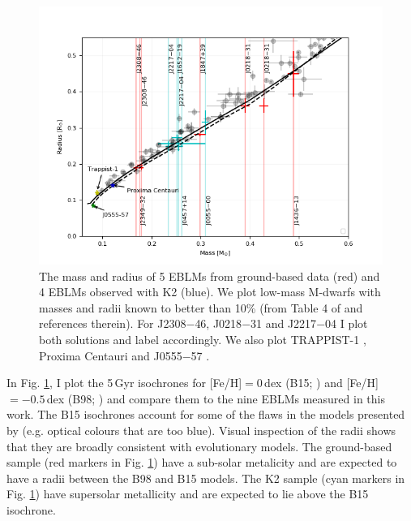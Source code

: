 \begin{figure}
    \centering
    \includegraphics{9-Discussion/images/mass_radius.png}
    \caption{The mass and radius of 5 EBLMs from ground-based data (red) and 4 EBLMs observed with K2 (blue). We plot low-mass M-dwarfs with masses and radii known to better than 10\% (from Table 4 of \protect\citep{2018arXiv180505841C} and references therein). For J2308$-$46, J0218$-$31 and J2217$-$04 I plot both solutions and label accordingly. We also plot TRAPPIST-1 \protect\citep{2018MNRAS.475.3577D}, Proxima Centauri \protect\citep{2016Natur.536..437A} and J0555$-$57 \protect\citep{vonBoetticher2017}. }
    \label{discussion:fig:mass_radius}
\end{figure}


In Fig. \ref{discussion:fig:mass_radius}, I plot the 5\,Gyr isochrones for [Fe/H]$=0$\,dex (B15; \citealt{2015A&A...577A..42B}) and [Fe/H]$=-0.5$\,dex (B98; \citealt{1998A&A...337..403B}) and compare them to the nine EBLMs measured in this work. The B15 isochrones account for some of the flaws in the models presented by \citet{1998A&A...337..403B} (e.g. optical colours that are too blue). Visual inspection of the radii shows that they are broadly consistent with evolutionary models. The ground-based sample (red markers in Fig. \ref{discussion:fig:mass_radius}) have a sub-solar metalicity and are expected to have a radii between the B98 and B15 models. The K2 sample (cyan markers in Fig. \ref{discussion:fig:mass_radius}) have supersolar metallicity and are expected to lie above the B15 isochrone.

